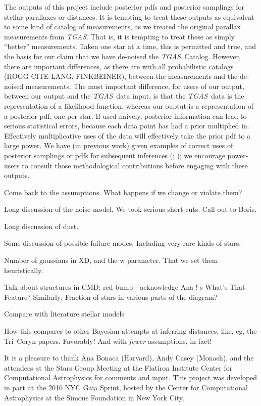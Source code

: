 \documentclass[modern]{aastex61}
\newcommand{\acronym}[1]{{\small{#1}}}
\newcommand{\project}[1]{\textsl{#1}}
\newcommand{\tgas}{\project{\acronym{TGAS}}}
\newcommand{\xd}{\acronym{XD}}
\begin{document}
The outputs of this project include posterior pdfs and posterior
samplings for stellar parallaxes or distances.
It is tempting to treat these outputs as equivalent to some kind of catalog of
measurements, as we treated the original parallax measurements from \tgas.
That is, it is tempting to treat these as simply ``better'' measurements.
Taken one star at a time, this is permitted and true, and the basis for our
claim that we have de-noised the \tgas\ Catalog.
However, there are important differences, as there are with all
probabilistic catalogs (HOGG CITE LANG, FINKBEINER), between the
measurements and the de-noised measurements.
The most important difference, for users of our output, between our
output and the \tgas\ data input, is that the \tgas\ data is the representation
of a likelihood function, whereas our ouptut is a
representation of a posterior pdf, one per star.
If used naively, posterior information can lead to serious statistical
errors, because each data point has had a prior multiplied in.
Effectively multiplicative uses of the data will effectively take the prior
pdf to a large power.
We have (in previous work)
given examples of correct uses of posterior samplings or pdfs
for subsequent inferences (\citealt{hogg08}; \citealt{dfm14}); we
encourage power-users to consult those methodological
contributions before engaging with these outputs.

Come back to the assumptions. What happens if we change or violate them?

Long discussion of the noise model. We took serious short-cuts. Call out to Boris.

Long discussion of dust.

Some discussion of possible failure modes. Including very rare kinds of stars.

Number of gaussians in \xd, and the w parameter. That we set them heuristically.

Talk about structures in CMD; red bump - acknowledge Ana ! s
What's That Feature? Similarly; Fraction of stars in various parts of the diagram?

Compare with literature stellar models

How this compares to other Bayesian attempts at inferring distances,
like, eg, the Tri--Coryn papers. Favorably! And with \emph{fewer}
assumptions, in fact!

\acknowledgments It is a pleasure to thank
  Ana Bonaca (Harvard),
  Andy Casey (Monash),
and the attendees at the Stars Group Meeting at the Flatiron Institute
Center for Computational Astrophysics for comments and input.
This project was developed in part at the 2016 \acronym{NYC} Gaia Sprint, hosted
by the Center for Computational Astrophysics at the Simons Foundation
in New York City.
\end{document}
